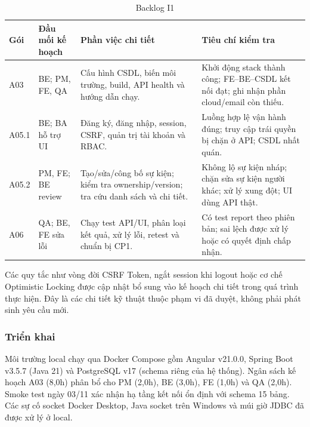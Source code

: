 \begin{table}[H]
\centering\small
\caption{Backlog I1}\label{tab:i1-lower}
\begin{tabularx}{\linewidth}{@{}p{.10\linewidth}p{.20\linewidth}XX@{}}
\toprule
\textbf{Gói} & \textbf{Đầu mối kế hoạch} & \textbf{Phần việc chi tiết} & \textbf{Tiêu chí kiểm tra}\\\midrule
A03 & BE; PM, FE, QA & Cấu hình CSDL, biến môi trường, build, API health và hướng dẫn chạy. & Khởi động stack thành công; FE--BE--CSDL kết nối đạt; ghi nhận phần cloud/email còn thiếu.\\
A05.1 & BE; BA hỗ trợ UI & Đăng ký, đăng nhập, session, CSRF, quản trị tài khoản và RBAC. & Luồng hợp lệ vận hành đúng; truy cập trái quyền bị chặn ở API; CSDL nhất quán.\\
A05.2 & PM, FE; BE review & Tạo/sửa/công bố sự kiện; kiểm tra ownership/version; tra cứu danh sách và chi tiết. & Không lộ sự kiện nháp; chặn sửa sự kiện người khác; xử lý xung đột; UI dùng API thật.\\
A06 & QA; BE, FE sửa lỗi & Chạy test API/UI, phân loại kết quả, xử lý lỗi, retest và chuẩn bị CP1. & Có test report theo phiên bản; sai lệch được xử lý hoặc có quyết định chấp nhận.\\
\bottomrule
\end{tabularx}
\end{table}

Các quy tắc như vòng đời CSRF Token, ngắt session khi logout hoặc cơ chế Optimistic Locking được cập nhật bổ sung vào kế hoạch chi tiết trong quá trình thực hiện. Đây là các chi tiết kỹ thuật thuộc phạm vi đã duyệt, không phải phát sinh yêu cầu mới.

\subsubsection{Triển khai}


Môi trường local chạy qua Docker Compose gồm Angular v21.0.0, Spring Boot v3.5.7 (Java 21) và PostgreSQL v17 (schema riêng của hệ thống). Ngân sách kế hoạch A03 (8,0h) phân bổ cho PM (2,0h), BE (3,0h), FE (1,0h) và QA (2,0h). Smoke test ngày 03/11 xác nhận hạ tầng kết nối ổn định với schema 15 bảng. Các sự cố socket Docker Desktop, Java socket trên Windows và múi giờ JDBC đã được xử lý ở local.

